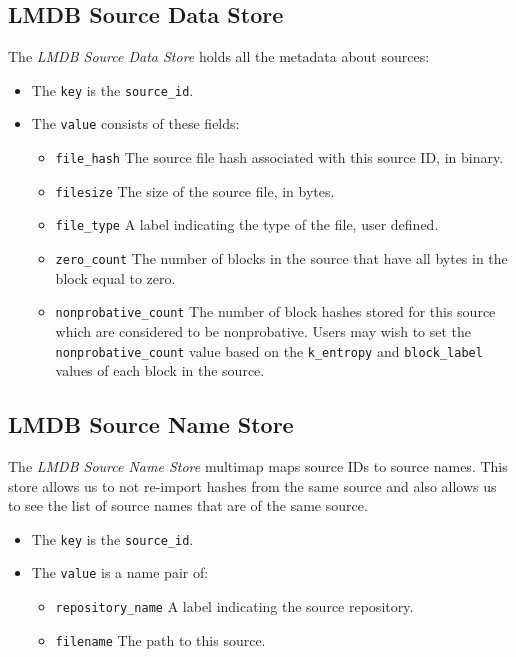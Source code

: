 \documentclass[11pt,fleqn]{article} %
\begin{document}
\subsection{LMDB Source Data Store}
The \textit{LMDB Source Data Store} holds all the metadata about sources:
\begin{itemize}
\item The \verb+key+ is the \verb+source_id+.
\item The \verb+value+ consists of these fields:
  \begin{itemize}
  \item \verb+file_hash+ The source file hash associated with this source ID, in binary.
  \item \verb+filesize+ The size of the source file, in bytes.
  \item \verb+file_type+ A label indicating the type of the file, user defined.
  \item \verb+zero_count+ The number of blocks in the source that have all bytes in the block equal to zero.
  \item \verb+nonprobative_count+ The number of block hashes stored for this source which are considered to be nonprobative.  Users may wish to set the \verb+nonprobative_count+ value based on the \verb+k_entropy+ and \verb+block_label+ values of each block in the source.
  \end{itemize}
\end{itemize}

\subsection{LMDB Source Name Store}
The \textit{LMDB Source Name Store} multimap maps source IDs to source names.  This store allows us to not re-import hashes from the same source and also allows us to see the list of source names that are of the same source.
\begin{itemize}
\item The \verb+key+ is the \verb+source_id+.
\item The \verb+value+ is a name pair of:
  \begin{itemize}
  \item \verb+repository_name+ A label indicating the source repository.
  \item \verb+filename+ The path to this source.
  \end{itemize}
\end{itemize}
\end{document}
